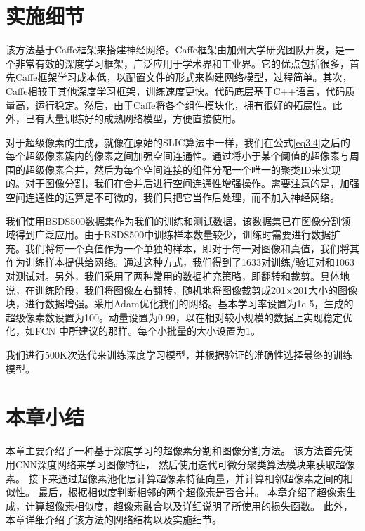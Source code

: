 \section{实施细节}

该方法基于Caffe框架来搭建神经网络。Caffe\cite{jia2014caffe}框架由加州大学研究团队开发，是一个非常有效的深度学习框架，广泛应用于学术界和工业界。它的优点包括很多，首先Caffe框架学习成本低，以配置文件的形式来构建网络模型，过程简单。其次，Caffe相较于其他深度学习框架，训练速度更快。代码底层基于C++语言，代码质量高，运行稳定。然后，由于Caffe将各个组件模块化，拥有很好的拓展性。此外，已有大量训练好的成熟网络模型，方便直接使用。

对于超级像素的生成，就像在原始的SLIC算法中一样，我们在公式\ref{eq3.4}之后的每个超级像素簇内的像素之间加强空间连通性。通过将小于某个阈值的超像素与周围的超级像素合并，然后为每个空间连接的组件分配一个唯一的聚类ID来实现的。对于图像分割，我们在合并后进行空间连通性增强操作。需要注意的是，加强空间连通性的运算是不可微的，我们只把它当作后处理，而不加入神经网络。

我们使用BSDS500数据集作为我们的训练和测试数据，该数据集已在图像分割领域得到广泛应用。由于BSDS500中训练样本数量较少，训练时需要进行数据扩充。我们将每一个真值作为一个单独的样本，即对于每一对图像和真值，我们将其作为训练样本提供给网络。通过这种方式，我们得到了1633对训练/验证对和1063对测试对。另外，我们采用了两种常用的数据扩充策略，即翻转和裁剪。具体地说，在训练阶段，我们将图像左右翻转，随机地将图像裁剪成201$\times $201大小的图像块，进行数据增强。采用Adam\cite{kingma2014adam}优化我们的网络。基本学习率设置为1e-5，生成的超级像素数设置为100。动量设置为0.99，以在相对较小规模的数据上实现稳定优化，如FCN 中所建议的那样。每个小批量的大小设置为1。

我们进行500K次迭代来训练深度学习模型，并根据验证的准确性选择最终的训练模型。

\section{本章小结}

本章主要介绍了一种基于深度学习的超像素分割和图像分割方法。
该方法首先使用CNN深度网络来学习图像特征，
然后使用迭代可微分聚类算法模块来获取超像素。
接下来通过超像素池化层计算超像素特征向量，并计算相邻超像素之间的相似性。
最后，根据相似度判断相邻的两个超像素是否合并。
本章介绍了超像素生成，计算超像素相似度，超像素融合以及详细说明了所使用的损失函数。
此外，本章详细介绍了该方法的网络结构以及实施细节。